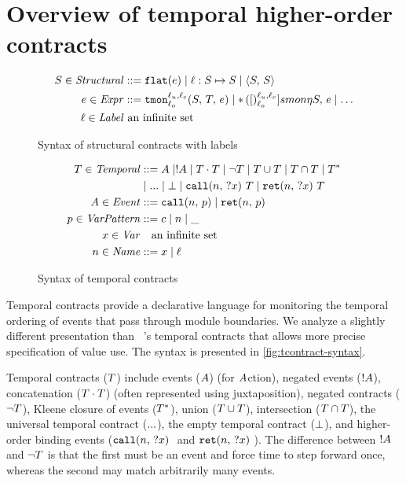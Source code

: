 \documentclass[preprint,onecolumn,9pt]{sigplanconf} %
\begin{document}
\section{Overview of temporal higher-order contracts}

\begin{figure}
  \begin{align*}
    S \in \mathit{Structural} &::= {\tt flat}(e) \mid \ell : S \mapsto S \mid \langle S,\, S\rangle
\\
    e \in \mathit{Expr} &::= {\tt tmon}{^{\ell_u,\ell_c}_{\ell_o}}({S,\,T,\,e})
                    \mid {\tt *}{\,}({[})^{\ell_u,\ell_c}_{\ell_o}]{smon}{\eta}{S,\, e}
                    \mid \ldots
\\
\ell \in \mathit{Label}&\text{ an infinite set} \\
  \end{align*}
  \caption{Syntax of structural contracts with labels}
  \label{fig:scontract-syntax}
\end{figure}

\begin{figure}
  \begin{align*}
 T \in \mathit{Temporal} &::=
      A \mid ! A
 \mid T \cdot T
 \mid \neg T
 \mid T \cup T
 \mid T \cap T
 \mid T^* \\
&\mid {\tt ...} \mid \bot
 \mid {\tt call}(n,\, {\tt ?}x)\ T
 \mid {\tt ret}(n,\, {\tt ?}x)\ T
\\
A \in \mathit{Event} &::= {\tt call}(n,\, p) \mid {\tt ret}(n,\, p) \\
p \in \mathit{VarPattern} &::= c \mid n \mid \_ \\
x \in \mathit{Var} &\quad\text{an infinite set} \\
n \in \mathit{Name} &::= x \mid \ell
  \end{align*}
  \caption{Syntax of temporal contracts}
  \label{fig:tcontract-syntax}
\end{figure}

Temporal contracts provide a declarative language for monitoring the temporal ordering of events that pass through module boundaries.
%
We analyze a slightly different presentation than ~\citep{ianjohnson:dfm:icfp2011}'s temporal contracts that allows more precise specification of value use.
%
The syntax is presented in \autoref{fig:tcontract-syntax}.

Temporal contracts ($T$) include events ($A$) (for $A$ction), negated events ($! A$), concatenation ($T \cdot T$) (often represented using juxtaposition), negated contracts ($\neg T$), Kleene closure of events ($T^*$), union ($T \cup T$), intersection ($T \cap T$), the universal temporal contract (${\tt ...}$), the empty temporal contract ($\bot$), and higher-order binding events ($\stcall{\mname}{\mvar}$ and $\stret{\mname}{\mvar}$).
%
The difference between $! A$ and $\neg T$ is that the first must be an event and force time to step forward once, whereas the second may match arbitrarily many events.
\end{document}
